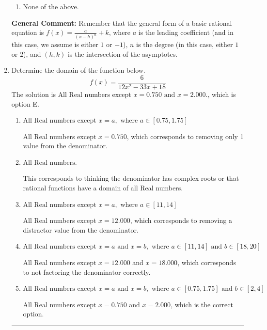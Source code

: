 \documentclass{extbook}[14pt]
\newcommand{\litem}[1]{\item #1

\rule{\textwidth}{0.4pt}}
\begin{document}
\begin{enumerate}
{\begin{enumerate}[label=\Alph*.]
\item None of the above.\end{enumerate}
\textbf{General Comment:} Remember that the general form of a basic rational equation is $ f(x) = \frac{a}{(x-h)^n} + k$, where $a$ is the leading coefficient (and in this case, we assume is either $1$ or $-1$), $n$ is the degree (in this case, either $1$ or $2$), and $(h, k)$ is the intersection of the asymptotes.
}
\litem{
Determine the domain of the function below.
\[ f(x) = \frac{6}{12x^{2} -33 x + 18} \]The solution is \( \text{All Real numbers except } x = 0.750 \text{ and } x = 2.000. \), which is option E.\begin{enumerate}[label=\Alph*.]
\item \( \text{All Real numbers except } x = a, \text{ where } a \in [0.75, 1.75] \)

All Real numbers except $x = 0.750$, which corresponds to removing only 1 value from the denominator.
\item \( \text{All Real numbers.} \)

This corresponds to thinking the denominator has complex roots or that rational functions have a domain of all Real numbers.
\item \( \text{All Real numbers except } x = a, \text{ where } a \in [11, 14] \)

All Real numbers except $x = 12.000$, which corresponds to removing a distractor value from the denominator.
\item \( \text{All Real numbers except } x = a \text{ and } x = b, \text{ where } a \in [11, 14] \text{ and } b \in [18, 20] \)

All Real numbers except $x = 12.000$ and $x = 18.000$, which corresponds to not factoring the denominator correctly.
\item \( \text{All Real numbers except } x = a \text{ and } x = b, \text{ where } a \in [0.75, 1.75] \text{ and } b \in [2, 4] \)

All Real numbers except $x = 0.750$ and $x = 2.000$, which is the correct option.
\end{enumerate}

}
\end{enumerate}
\end{document}
